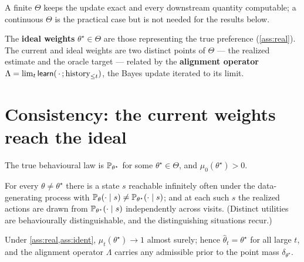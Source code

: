 \documentclass[../uxoxo-main]{subfiles}
\begin{document}
A finite $\Theta$ keeps the update exact and every downstream quantity
computable; a continuous $\Theta$ is the practical case but is not needed for the
results below.

\begin{definition}\label{def:align}
The \textbf{ideal weights} $\theta^\star\in\Theta$ are those representing the true
preference (\cref{ass:real}). The current and ideal weights are two distinct
points of $\Theta$ --- the realized estimate and the oracle target --- related by
the \textbf{alignment operator} $\Lambda=\lim_{t}\mathsf{learn}(\,\cdot\,;\text{history}_{\le t})$,
the Bayes update iterated to its limit.
\end{definition}

\section{Consistency: the current weights reach the ideal}\label{sec:consistency}
\begin{assumption}[Realizability]\label{ass:real}
The true behavioural law is $\mathbb{P}_{\theta^\star}$ for some
$\theta^\star\in\Theta$, and $\mu_0(\theta^\star)>0$.
\end{assumption}

\begin{assumption}\label{ass:ident}
For every $\theta\ne\theta^\star$ there is a state $s$ reachable infinitely often
under the data-generating process with
$\mathbb{P}_\theta(\cdot\mid s)\ne\mathbb{P}_{\theta^\star}(\cdot\mid s)$; and at each such
$s$ the realized actions are drawn from $\mathbb{P}_{\theta^\star}(\cdot\mid s)$
independently across visits. (Distinct utilities are behaviourally
distinguishable, and the distinguishing situations recur.)
\end{assumption}

\begin{theorem}\label{thm:consistency}
Under \cref{ass:real,ass:ident}, $\mu_t(\theta^\star)\to1$ almost surely; hence
$\hat\theta_t=\theta^\star$ for all large $t$, and the alignment operator
$\Lambda$ carries any admissible prior to the point mass $\delta_{\theta^\star}$.
\end{theorem}
\end{document}
